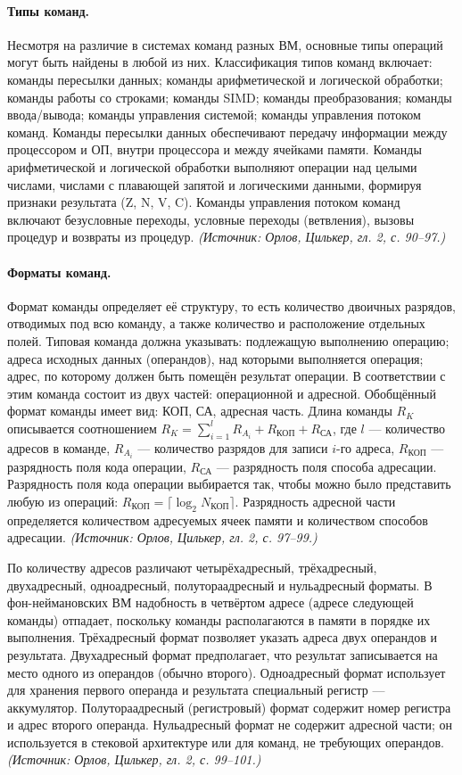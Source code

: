 \documentclass[a4paper,12pt]{article}
\begin{document}
\paragraph{Типы команд.}
Несмотря на различие в системах команд разных ВМ, основные типы операций могут быть найдены в любой из них. Классификация типов команд включает: команды пересылки данных; команды арифметической и логической обработки; команды работы со строками; команды SIMD; команды преобразования; команды ввода/вывода; команды управления системой; команды управления потоком команд. Команды пересылки данных обеспечивают передачу информации между процессором и ОП, внутри процессора и между ячейками памяти. Команды арифметической и логической обработки выполняют операции над целыми числами, числами с плавающей запятой и логическими данными, формируя признаки результата (Z, N, V, C). Команды управления потоком команд включают безусловные переходы, условные переходы (ветвления), вызовы процедур и возвраты из процедур.
\textit{(Источник: Орлов, Цилькер, гл. 2, с. 90--97.)}

\paragraph{Форматы команд.}
Формат команды определяет её структуру, то есть количество двоичных разрядов, отводимых под всю команду, а также количество и расположение отдельных полей. Типовая команда должна указывать: подлежащую выполнению операцию; адреса исходных данных (операндов), над которыми выполняется операция; адрес, по которому должен быть помещён результат операции. В соответствии с этим команда состоит из двух частей: операционной и адресной. Обобщённый формат команды имеет вид: КОП, СА, адресная часть. Длина команды \(R_K\) описывается соотношением \(R_K=\sum_{i=1}^{l} R_{A_i}+R_{\text{КОП}}+R_{\text{СА}}\), где \(l\) --- количество адресов в команде, \(R_{A_i}\) --- количество разрядов для записи \(i\)-го адреса, \(R_{\text{КОП}}\) --- разрядность поля кода операции, \(R_{\text{СА}}\) --- разрядность поля способа адресации. Разрядность поля кода операции выбирается так, чтобы можно было представить любую из операций: \(R_{\text{КОП}}=\lceil \log_2 N_{\text{КОП}}\rceil\). Разрядность адресной части определяется количеством адресуемых ячеек памяти и количеством способов адресации.
\textit{(Источник: Орлов, Цилькер, гл. 2, с. 97--99.)}

По количеству адресов различают четырёхадресный, трёхадресный, двухадресный, одноадресный, полутораадресный и нульадресный форматы. В фон-неймановских ВМ надобность в четвёртом адресе (адресе следующей команды) отпадает, поскольку команды располагаются в памяти в порядке их выполнения. Трёхадресный формат позволяет указать адреса двух операндов и результата. Двухадресный формат предполагает, что результат записывается на место одного из операндов (обычно второго). Одноадресный формат использует для хранения первого операнда и результата специальный регистр --- аккумулятор. Полутораадресный (регистровый) формат содержит номер регистра и адрес второго операнда. Нульадресный формат не содержит адресной части; он используется в стековой архитектуре или для команд, не требующих операндов.
\textit{(Источник: Орлов, Цилькер, гл. 2, с. 99--101.)}
\end{document}

